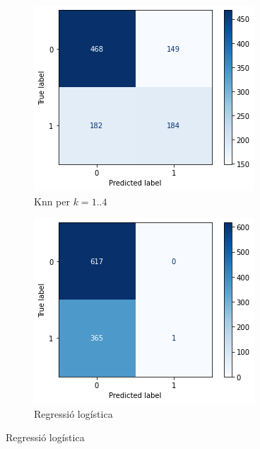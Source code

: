 \documentclass{article}
\begin{document}
	\begin{figure}[!h]
		\centering
		\begin{subfigure}[b]{0.25\textwidth}
			\centering
			\includegraphics[width=\textwidth]{../images/cmatrix-knn}
			\caption*{Knn per $k=1..4$}
			\label{fig:knn}
		\end{subfigure}
		\hfill
		\begin{subfigure}[b]{0.25\textwidth}
			\centering
			\includegraphics[width=\textwidth]{../images/cmatrix-logistic}
			\caption*{Regressió logística}

\end{subfigure}
\end{figure}
\end{document}
